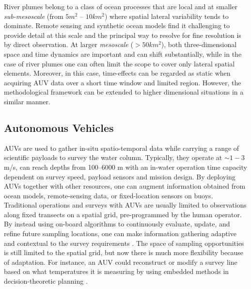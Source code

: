 \documentclass[aoas]{imsart}
\begin{document}


River plumes belong to a class of ocean processes that are local and
at smaller \emph{sub-mesoscale} (from $5 m^2$ -- $10 km^2$) where
spatial lateral variability tends to dominate. Remote sensing and
synthetic ocean models find it challenging to provide detail at this
scale \citep{Lermusiaux:2006} and the principal way to resolve for
fine resolution is by direct observation. At larger \emph{mesoscale}
($>50 km^2$), both three-dimensional space and time dynamics are
important and can shift substantially, while in the case of river
plumes one can often limit the scope to cover only lateral spatial
elements. Moreover, in this case, time-effects can be regarded as
static when acquiring AUV data over a short time window and limited
region. However, the methodological framework can be extended to
higher dimensional situations in a similar manner.

\subsection{Autonomous Vehicles}

AUVs are used to gather in-situ spatio-temporal data while carrying a range of scientific payloads to survey the
water column. Typically, they operate at $\sim 1-3$ m/s, can reach
depths from 100--6000 m with an in-water operation time capacity dependent on
survey speed, payload sensors and mission design. By deploying AUVs
together with other resources, one can augment information obtained
from ocean models, remote-sensing data, or fixed-location
sensors on buoys. Traditional operations and surveys with AUVs are
usually limited to observations along fixed transects on a spatial
grid, pre-programmed by the human operator. By instead using on-board
algorithms to continuously evaluate, update, and refine future
sampling locations, one can make information gathering adaptive and
contextual to the survey requirements
\citep{das11b,fossuminformation,fossum18b}. The space of sampling
opportunities is still limited to the spatial grid, but now there is
much more flexibility because of adaptation. For instance, an AUV
could reconstruct or modify a survey line based on what temperatures
it is measuring by using embedded methods in decision-theoretic
planning \citep{py10,Rajan12,Rajan12b}.
\end{document}
